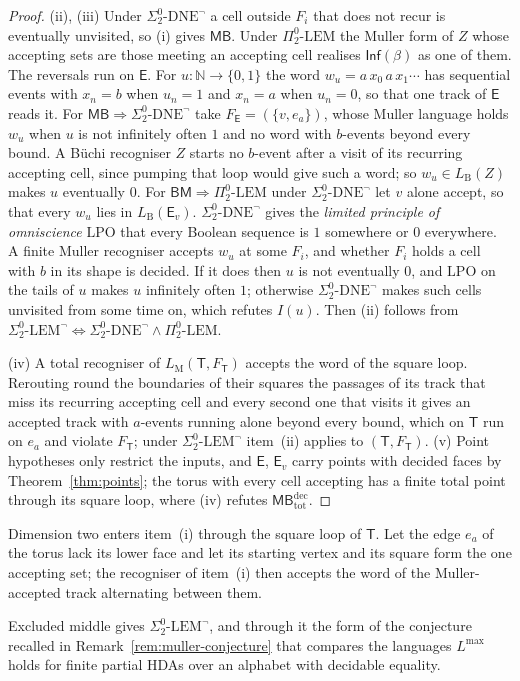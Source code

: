 \documentclass{lmcs}
\theoremstyle{definition}
\theoremstyle{remark}
\newcommand{\Nn}{\mathbb{N}}
\newcommand{\prin}[1]{\mathrm{#1}}
\newcommand{\EIO}{\Sigma^0_2\text{-}\prin{LEM}^{\neg}}
\providecommand{\SDNE}{\Sigma^0_2\text{-}\prin{DNE}^{\neg}}
\providecommand{\PLEM}{\Pi^0_2\text{-}\prin{LEM}}
\providecommand{\LPO}{\prin{LPO}}
\providecommand{\LB}[1]{L_{\mathrm{B}}(#1)}
\providecommand{\LM}[1]{L_{\mathrm{M}}(#1)}
\providecommand{\Inf}{\mathsf{Inf}}
\providecommand{\MinB}{\mathsf{MB}}
\providecommand{\BinM}{\mathsf{BM}}
\providecommand{\MinBtd}{\mathsf{MB}^{\mathrm{dec}}_{\mathrm{tot}}}
\providecommand{\SDNE}{\Sigma^0_2\text{-}\prin{DNE}^{\neg}}
\providecommand{\PLEM}{\Pi^0_2\text{-}\prin{LEM}}
\providecommand{\FT}{F_{\mathsf{T}}}
\begin{document}
\begin{proof}
(ii), (iii) Under $\SDNE$ a cell outside $F_i$ that does not recur is eventually unvisited, so (i) gives
$\MinB$.
Under $\PLEM$ the Muller form of $Z$ whose accepting sets are those meeting an accepting cell
\cite{PAF25} realises $\Inf(\beta)$ as one of them. The reversals run on $\mathsf{E}$. For
$u\colon\Nn\to\{0,1\}$ the word $w_u=a\,x_0\,a\,x_1\cdots$ has sequential events with $x_n=b$ when
$u_n=1$ and $x_n=a$ when $u_n=0$, so that one track of $\mathsf{E}$ reads it. For $\MinB\Rightarrow\SDNE$ take $F_{\mathsf{E}}=(\{v,e_a\})$, whose Muller
language holds $w_u$ when $u$ is not infinitely often $1$ and no word with $b$-events beyond every bound. A
B\"uchi recogniser $Z$ starts no $b$-event after a visit of its recurring accepting cell, since pumping that loop would
give such a word; so $w_u\in\LB{Z}$ makes $u$ eventually
$0$. For $\BinM\Rightarrow\PLEM$ under $\SDNE$ let
$v$ alone accept, so that every $w_u$ lies in $\LB{\mathsf{E}_v}$. $\SDNE$ gives the \emph{limited principle of omniscience} $\LPO$ that every Boolean
sequence is $1$ somewhere or $0$ everywhere. A finite
Muller recogniser accepts $w_u$ at some $F_i$, and whether $F_i$ holds a cell with $b$ in its shape is decided. If
it does then $u$ is not eventually $0$, and $\LPO$ on the tails of $u$ makes $u$ infinitely often $1$; otherwise
$\SDNE$ makes such cells unvisited from some time on, which refutes $I(u)$. Then
(ii) follows from $\EIO\iff\SDNE\wedge\PLEM$.

(iv) A total recogniser of $\LM{\mathsf{T},\FT}$ accepts the word of the square loop. Rerouting round the boundaries of
their squares the passages of its track that miss its recurring accepting cell and every second one that visits it
gives an accepted track with $a$-events running alone beyond every bound, which on $\mathsf{T}$ run on $e_a$ and violate
$\FT$; under $\EIO$
item~(ii) applies to $(\mathsf{T},\FT)$. (v) Point
hypotheses only restrict the inputs, and $\mathsf{E}$, $\mathsf{E}_v$ carry points with decided faces by
Theorem~\ref{thm:points};
the torus with every cell accepting has a finite total point through its square loop, where (iv) refutes
$\MinBtd$.
\end{proof}

Dimension two enters item~(i) through the square loop of $\mathsf{T}$. Let the edge $e_a$ of the torus lack its lower face and
let its starting vertex and its square form the one accepting set; the recogniser of item~(i) then accepts the word of
the Muller-accepted track alternating between them.

Excluded middle gives $\EIO$, and through it the form of the conjecture recalled in
Remark~\ref{rem:muller-conjecture} that compares the languages $L^{\max}$ holds for finite partial HDAs over an
alphabet with decidable equality.
\end{document}
